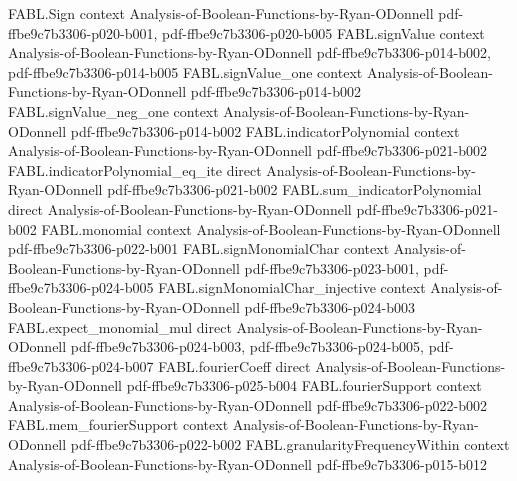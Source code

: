 \begin{theorem}
\label{FABL.totalInfluence_eq_sum_level_mul_fourierWeight}
\leanok
{}
\proofstep
  {FABL.Sign}
  {context}
  {Analysis-of-Boolean-Functions-by-Ryan-ODonnell}
  {pdf-ffbe9c7b3306-p020-b001,
    pdf-ffbe9c7b3306-p020-b005}
\proofstep
  {FABL.signValue}
  {context}
  {Analysis-of-Boolean-Functions-by-Ryan-ODonnell}
  {pdf-ffbe9c7b3306-p014-b002,
    pdf-ffbe9c7b3306-p014-b005}
\proofstep
  {FABL.signValue_one}
  {context}
  {Analysis-of-Boolean-Functions-by-Ryan-ODonnell}
  {pdf-ffbe9c7b3306-p014-b002}
\proofstep
  {FABL.signValue_neg_one}
  {context}
  {Analysis-of-Boolean-Functions-by-Ryan-ODonnell}
  {pdf-ffbe9c7b3306-p014-b002}
\proofstep
  {FABL.indicatorPolynomial}
  {context}
  {Analysis-of-Boolean-Functions-by-Ryan-ODonnell}
  {pdf-ffbe9c7b3306-p021-b002}
\proofstep
  {FABL.indicatorPolynomial_eq_ite}
  {direct}
  {Analysis-of-Boolean-Functions-by-Ryan-ODonnell}
  {pdf-ffbe9c7b3306-p021-b002}
\proofstep
  {FABL.sum_indicatorPolynomial}
  {direct}
  {Analysis-of-Boolean-Functions-by-Ryan-ODonnell}
  {pdf-ffbe9c7b3306-p021-b002}
\proofstep
  {FABL.monomial}
  {context}
  {Analysis-of-Boolean-Functions-by-Ryan-ODonnell}
  {pdf-ffbe9c7b3306-p022-b001}
\proofstep
  {FABL.signMonomialChar}
  {context}
  {Analysis-of-Boolean-Functions-by-Ryan-ODonnell}
  {pdf-ffbe9c7b3306-p023-b001,
    pdf-ffbe9c7b3306-p024-b005}
\proofstep
  {FABL.signMonomialChar_injective}
  {context}
  {Analysis-of-Boolean-Functions-by-Ryan-ODonnell}
  {pdf-ffbe9c7b3306-p024-b003}
\proofstep
  {FABL.expect_monomial_mul}
  {direct}
  {Analysis-of-Boolean-Functions-by-Ryan-ODonnell}
  {pdf-ffbe9c7b3306-p024-b003,
    pdf-ffbe9c7b3306-p024-b005,
    pdf-ffbe9c7b3306-p024-b007}
\proofstep
  {FABL.fourierCoeff}
  {direct}
  {Analysis-of-Boolean-Functions-by-Ryan-ODonnell}
  {pdf-ffbe9c7b3306-p025-b004}
\proofstep
  {FABL.fourierSupport}
  {context}
  {Analysis-of-Boolean-Functions-by-Ryan-ODonnell}
  {pdf-ffbe9c7b3306-p022-b002}
\proofstep
  {FABL.mem_fourierSupport}
  {context}
  {Analysis-of-Boolean-Functions-by-Ryan-ODonnell}
  {pdf-ffbe9c7b3306-p022-b002}
\proofstep
  {FABL.granularityFrequencyWithin}
  {context}
  {Analysis-of-Boolean-Functions-by-Ryan-ODonnell}
  {pdf-ffbe9c7b3306-p015-b012}

\end{theorem}
